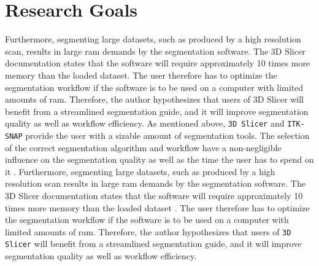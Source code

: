 \section{Research Goals}
\label{s:introduction-researchgoals}
Furthermore, segmenting large datasets, such as produced by a high resolution \mct\space scan, results in large \acrfull{ram} demands by the segmentation software.
The 3D Slicer documentation states that the software will require approximately 10 times more memory than the loaded dataset.
The user therefore has to optimize the segmentation workflow if the software is to be used on a computer with limited amounts of \acrshort{ram}.
Therefore, the author hypothesizes that users of 3D Slicer will benefit from a streamlined segmentation guide, and it will improve segmentation quality as well as workflow efficiency.
As mentioned above, \texttt{3D Slicer} and \texttt{ITK-SNAP} provide the user with a sizable amount of segmentation tools. The selection of the correct segmentation algorithm and workflow have a non-negligible influence on the segmentation quality as well as the time the user has to spend on it \cite{liuSAMMSegmentAny2023}.
Furthermore, segmenting large datasets, such as produced by a high resolution \mct\space scan results in large \acrshort{ram} demands by the segmentation software\cite{smistadMedicalImageSegmentation2015}.
The 3D Slicer documentation states that the software will require approximately 10 times more memory than the loaded dataset \cite{slicercommunity3DSlicerImage2022,fedorov3DSlicerImage2012}.
The user therefore has to optimize the segmentation workflow if the software is to be used on a computer with limited amounts of \acrshort{ram}.
Therefore, the author hypothesizes that users of \texttt{3D Slicer} will benefit from a streamlined segmentation guide, and it will improve segmentation quality as well as workflow efficiency.


